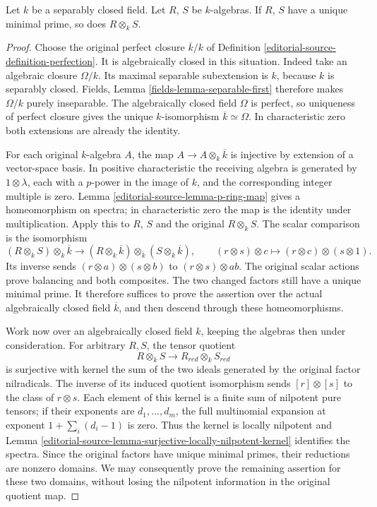 \begin{lemma}
\label{editorial-source-lemma-separably-closed-irreducible}
Let $k$ be a separably closed field.
Let $R$, $S$ be $k$-algebras. If $R$, $S$ have a unique
minimal prime, so does $R \otimes_k S$.
\end{lemma}

\begin{proof}
Choose the original perfect closure
$\overline k/k$ of Definition
\ref{editorial-source-definition-perfection}. It is
algebraically closed in this situation.
Indeed take an algebraic closure
$\Omega/k$. Its maximal separable
subextension is $k$, because $k$
is separably closed. Fields, Lemma
\ref{fields-lemma-separable-first}
therefore makes $\Omega/k$ purely
inseparable. The algebraically
closed field $\Omega$ is perfect,
so uniqueness of perfect closure
gives the unique $k$-isomorphism
$\overline k\simeq\Omega$.
In characteristic zero both
extensions are already the identity.

For each original $k$-algebra $A$,
the map $A\to A\otimes_k\overline k$
is injective by extension of a
vector-space basis. In positive
characteristic the receiving algebra
is generated by $1\otimes\lambda$,
each with a $p$-power in the image
of $k$, and the corresponding
integer multiple is zero.
Lemma \ref{editorial-source-lemma-p-ring-map} gives
a homeomorphism on spectra; in
characteristic zero the map is
the identity under multiplication.
Apply this to $R$, $S$ and the
original $R\otimes_k S$.
The scalar comparison is the
isomorphism
$$
(R\otimes_k S)\otimes_k\overline k
\longrightarrow
(R\otimes_k\overline k)\otimes_{\overline k}
(S\otimes_k\overline k),
\qquad
(r\otimes s)\otimes c\longmapsto
(r\otimes c)\otimes(s\otimes1).
$$
Its inverse sends
$(r\otimes a)\otimes(s\otimes b)$
to $(r\otimes s)\otimes ab$.
The original scalar actions prove
balancing and both composites.
The two changed factors still
have a unique minimal prime.
It therefore suffices to prove
the assertion over the actual
algebraically closed field
$\overline k$, and then descend
through these homeomorphisms.

Work now over an algebraically
closed field $k$, keeping the
algebras then under consideration.
For arbitrary $R,S$, the tensor
quotient
$$
R\otimes_k S\longrightarrow R_{red}\otimes_k S_{red}
$$
is surjective with kernel
the sum of the two ideals
generated by the original factor
nilradicals. The inverse of its
induced quotient isomorphism
sends $[r]\otimes[s]$ to the
class of $r\otimes s$.
Each element of this kernel is
a finite sum of nilpotent pure
tensors; if their exponents are
$d_1,\ldots,d_m$, the full
multinomial expansion at exponent
$1+\sum_i(d_i-1)$ is zero.
Thus the kernel is locally
nilpotent and Lemma
\ref{editorial-source-lemma-surjective-locally-nilpotent-kernel}
identifies the spectra.
Since the original factors have
unique minimal primes, their
reductions are nonzero domains.
We may consequently prove the
remaining assertion for these
two domains, without losing the
nilpotent information in the
original quotient map.


\end{proof}
